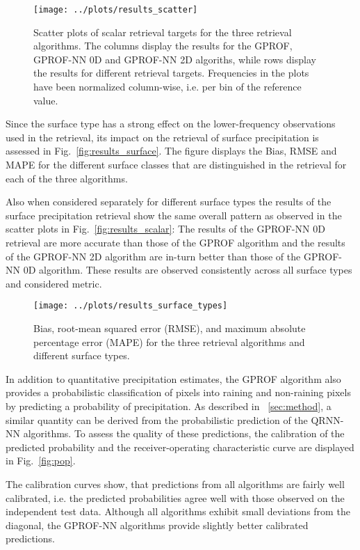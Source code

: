 \documentclass[a4paper,11pt,bibtotoc]{scrartcl}
\begin{document}
\begin{figure}[hbpt]
  \centering
  \texttt{[image: ../plots/results\_scatter]}
  \caption{
    Scatter plots of scalar retrieval targets for the
    three retrieval algorithms. The columns display the results
    for the GPROF, GPROF-NN 0D and GPROF-NN 2D algoriths, while
    rows display the results for different retrieval targets. Frequencies
    in the plots have been normalized column-wise, i.e. per bin of
    the reference value.
  }
  \label{fig:data_augmenation}
\end{figure}

Since the surface type has a strong effect on the lower-frequency observations
used in the retrieval, its impact on the retrieval of surface precipitation is
assessed in Fig.~\ref{fig:results_surface}. The figure displays the Bias, RMSE
and MAPE for the different surface classes that are distinguished in the
retrieval for each of the three algorithms.

Also when considered separately for different surface types the results of the
surface precipitation retrieval show the same overall pattern as observed in
the scatter plots in Fig.~\ref{fig:results_scalar}: The results of the GPROF-NN 0D
retrieval are more accurate than those of the GPROF algorithm and the results
of the GPROF-NN 2D algorithm are in-turn better than those of the GPROF-NN 0D
algorithm. These results are observed consistently across all surface types
and considered metric.


\begin{figure}[hbpt]
  \centering
  \texttt{[image: ../plots/results\_surface\_types]}
  \caption{
    Bias, root-mean squared error (RMSE), and maximum absolute percentage error (MAPE) for
    the three retrieval algorithms and different surface types.
  }
  \label{fig:data_augmenation}
\end{figure}

In addition to quantitative precipitation estimates, the GPROF algorithm also provides a
probabilistic classification of pixels into raining and non-raining pixels by predicting
a probability of precipitation. As described in ~\ref{sec:method}, a similar quantity can
be derived from the probabilistic prediction of the QRNN-NN algorithms. To assess the quality
of these predictions, the calibration of the predicted probability and the receiver-operating
characteristic curve are displayed in Fig.~\ref{fig:pop}.

The calibration curves show, that predictions from all algorithms are fairly
well calibrated, i.e. the predicted probabilities agree well with those observed
on the independent test data. Although all algorithms exhibit small deviations from the 
diagonal, the GPROF-NN algorithms provide slightly better calibrated predictions.
\end{document}
